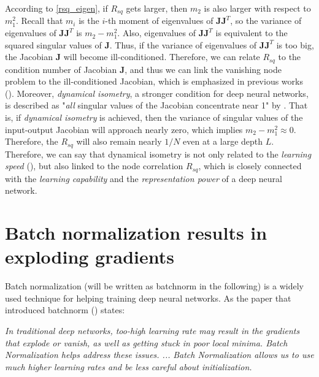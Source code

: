 According to \eqref{rsq_eigen}, if $R_{sq}$ gets larger, then $m_2$ is also larger with respect to
$m_1^2$. Recall that $m_i$ is the $i$-th moment of eigenvalues of $\mathbf{JJ}^T$, so the variance
of eigenvalues of $\mathbf{JJ}^T$ is $m_2-m_1^2$. Also, eigenvalues of $\mathbf{JJ}^T$ is equivalent
to the squared singular values of $\mathbf{J}$. Thus, if the variance of eigenvalues of $\mathbf{JJ}^T$
is too big, the Jacobian $\mathbf{J}$ will become ill-conditioned. Therefore, we can relate $R_{sq}$
to the condition number of Jacobian $\mathbf{J}$, and thus we can link the vanishing node problem to
the ill-conditioned Jacobian, which is emphasized in previous works (\cite{mft:sigmoid, mft:spectral,
mft:linear}).
Moreover, \textit{dynamical isometry}, a stronger condition for deep neural networks, is described
as "\textit{all} singular values of the Jacobian concentrate near 1" by \cite{mft:sigmoid, mft:linear}.
That is, if \textit{dynamical isometry} is achieved, then the variance of singular values of the
input-output Jacobian will approach nearly zero, which implies $m_2-m_1^2\approx 0$. Therefore,
the $R_{sq}$ will also remain nearly $1/N$ even at a large depth $L$.
Therefore, we can say that dynamical isometry is not only related to the \textit{learning speed}
(\cite{mft:linear}), but also linked to the node correlation $R_{sq}$, which is closely connected
with the \textit{learning capability} and the \textit{representation power} of a deep neural network.



% 

\iffalse

\section{Batch normalization results in exploding gradients} \label{comp:bn}

Batch normalization (will be written as batchnorm in the following) is a widely
used technique for helping training deep neural networks. As the paper that introduced
batchnorm (\cite{batchnorm}) states:

\textit{In traditional deep networks, too-high learning rate may result in the gradients that
explode or vanish, as well as getting stuck in poor local minima. Batch Normalization helps
address these issues. ...}
\textit{Batch Normalization allows us to use much higher learning rates and
be less careful about initialization.}

